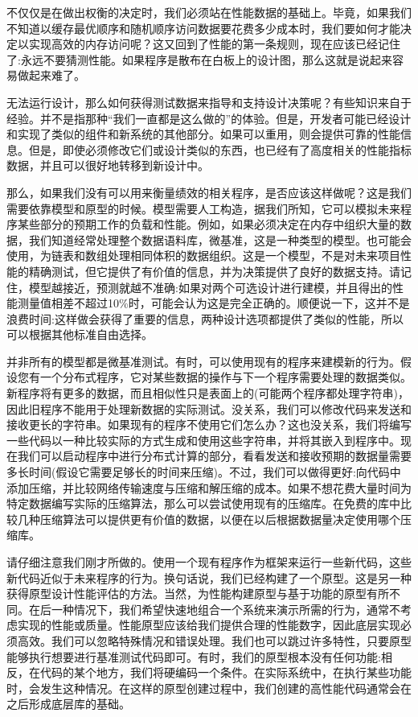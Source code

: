 不仅仅是在做出权衡的决定时，我们必须站在性能数据的基础上。毕竟，如果我们不知道以缓存最优顺序和随机顺序访问数据要花费多少成本时，我们要如何才能决定以实现高效的内存访问呢？这又回到了性能的第一条规则，现在应该已经记住了:永远不要猜测性能。如果程序是散布在白板上的设计图，那么这就是说起来容易做起来难了。 

无法运行设计，那么如何获得测试数据来指导和支持设计决策呢？有些知识来自于经验。并不是指那种“我们一直都是这么做的”的体验。但是，开发者可能已经设计和实现了类似的组件和新系统的其他部分。如果可以重用，则会提供可靠的性能信息。但是，即使必须修改它们或设计类似的东西，也已经有了高度相关的性能指标数据，并且可以很好地转移到新设计中。 

那么，如果我们没有可以用来衡量绩效的相关程序，是否应该这样做呢？这是我们需要依靠模型和原型的时候。模型需要人工构造，据我们所知，它可以模拟未来程序某些部分的预期工作的负载和性能。例如，如果必须决定在内存中组织大量的数据，我们知道经常处理整个数据语料库，微基准，这是一种类型的模型。也可能会使用，为链表和数组处理相同体积的数据组织。这是一个模型，不是对未来项目性能的精确测试，但它提供了有价值的信息，并为决策提供了良好的数据支持。请记住，模型越接近，预测就越不准确:如果对两个可选设计进行建模，并且得出的性能测量值相差不超过10\%时，可能会认为这是完全正确的。顺便说一下，这并不是浪费时间:这样做会获得了重要的信息，两种设计选项都提供了类似的性能，所以可以根据其他标准自由选择。 

并非所有的模型都是微基准测试。有时，可以使用现有的程序来建模新的行为。假设您有一个分布式程序，它对某些数据的操作与下一个程序需要处理的数据类似。新程序将有更多的数据，而且相似性只是表面上的(可能两个程序都处理字符串)，因此旧程序不能用于处理新数据的实际测试。没关系，我们可以修改代码来发送和接收更长的字符串。如果现有的程序不使用它们怎么办？这也没关系，我们将编写一些代码以一种比较实际的方式生成和使用这些字符串，并将其嵌入到程序中。现在我们可以启动程序中进行分布式计算的部分，看看发送和接收预期的数据量需要多长时间(假设它需要足够长的时间来压缩)。不过，我们可以做得更好:向代码中添加压缩，并比较网络传输速度与压缩和解压缩的成本。如果不想花费大量时间为特定数据编写实际的压缩算法，那么可以尝试使用现有的压缩库。在免费的库中比较几种压缩算法可以提供更有价值的数据，以便在以后根据数据量决定使用哪个压缩库。 

请仔细注意我们刚才所做的。使用一个现有程序作为框架来运行一些新代码，这些新代码近似于未来程序的行为。换句话说，我们已经构建了一个原型。这是另一种获得原型设计性能评估的方法。当然，为性能构建原型与基于功能的原型有所不同。在后一种情况下，我们希望快速地组合一个系统来演示所需的行为，通常不考虑实现的性能或质量。性能原型应该给我们提供合理的性能数字，因此底层实现必须高效。我们可以忽略特殊情况和错误处理。我们也可以跳过许多特性，只要原型能够执行想要进行基准测试代码即可。有时，我们的原型根本没有任何功能:相反，在代码的某个地方，我们将硬编码一个条件。在实际系统中，在执行某些功能时，会发生这种情况。在这样的原型创建过程中，我们创建的高性能代码通常会在之后形成底层库的基础。

